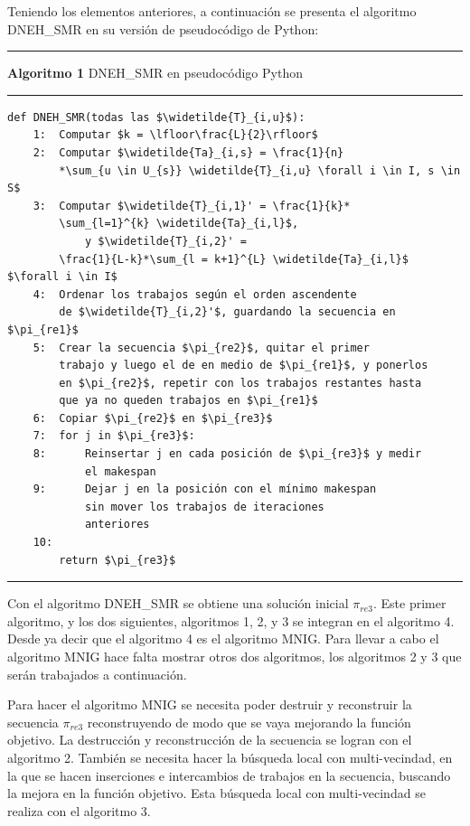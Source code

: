 \documentclass{article}
\begin{document}
\vspace{\baselineskip}
Teniendo los elementos anteriores, a continuación se presenta el algoritmo DNEH\_SMR en su versión de pseudocódigo de Python:

\pagebreak

\noindent\noindent
\rule{\linewidth}{0.4pt}

\textbf{Algoritmo 1} DNEH\_SMR en pseudocódigo Python

\noindent\noindent
\rule{\linewidth}{0.4pt}
    
\begin{lstlisting}[mathescape=true]
    def DNEH_SMR(todas las $\widetilde{T}_{i,u}$):
    1:  Computar $k = \lfloor\frac{L}{2}\rfloor$
    2:  Computar $\widetilde{Ta}_{i,s} = \frac{1}{n}
        *\sum_{u \in U_{s}} \widetilde{T}_{i,u} \forall i \in I, s \in S$
    3:  Computar $\widetilde{T}_{i,1}' = \frac{1}{k}*
        \sum_{l=1}^{k} \widetilde{Ta}_{i,l}$, 
            y $\widetilde{T}_{i,2}' = 
        \frac{1}{L-k}*\sum_{l = k+1}^{L} \widetilde{Ta}_{i,l}$ $\forall i \in I$
    4:  Ordenar los trabajos según el orden ascendente 
        de $\widetilde{T}_{i,2}'$, guardando la secuencia en $\pi_{re1}$
    5:  Crear la secuencia $\pi_{re2}$, quitar el primer 
        trabajo y luego el de en medio de $\pi_{re1}$, y ponerlos
        en $\pi_{re2}$, repetir con los trabajos restantes hasta
        que ya no queden trabajos en $\pi_{re1}$
    6:  Copiar $\pi_{re2}$ en $\pi_{re3}$
    7:  for j in $\pi_{re3}$:
    8:      Reinsertar j en cada posición de $\pi_{re3}$ y medir
            el makespan
    9:      Dejar j en la posición con el mínimo makespan
            sin mover los trabajos de iteraciones
            anteriores
    10: 
        return $\pi_{re3}$
\end{lstlisting}

\noindent\noindent
\rule{\textwidth}{0.4pt}

\vspace{\baselineskip}
Con el algoritmo DNEH\_SMR se obtiene una solución inicial $\pi_{re3}$. Este primer algoritmo, y los dos siguientes, algoritmos 1, 2, y 3 se integran en el algoritmo 4. Desde ya decir que el algoritmo 4 es el algoritmo MNIG. Para llevar a cabo el algoritmo MNIG hace falta mostrar otros dos algoritmos, los algoritmos 2 y 3 que serán trabajados a continuación.

\vspace{\baselineskip}
Para hacer el algoritmo MNIG se necesita poder destruir y reconstruir la secuencia $\pi_{re3}$ reconstruyendo de modo que se vaya mejorando la función objetivo. La destrucción y reconstrucción de la secuencia se logran con el algoritmo 2. También se necesita hacer la búsqueda local con multi-vecindad, en la que se hacen inserciones e intercambios de trabajos en la secuencia, buscando la mejora en la función objetivo. Esta búsqueda local con multi-vecindad se realiza con el algoritmo 3. \autocite{algMNIG}
\end{document}
